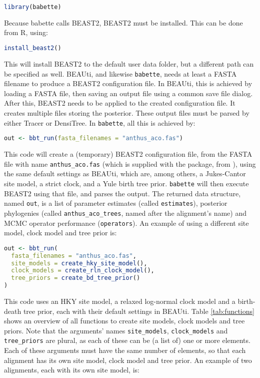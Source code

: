 \begin{lstlisting}[language=R, floatplacement=H]
library(babette)
\end{lstlisting}
Because babette calls BEAST2, BEAST2 must be installed. This can be done from R, using:

\begin{lstlisting}[language=R, floatplacement=H]
install_beast2()
\end{lstlisting}
This will install BEAST2 to the default user data folder, but a different path can be specified as well.
BEAUti, and likewise \verb;babette;, needs at least a FASTA filename
to produce a BEAST2 configuration file. 
In BEAUti, this is achieved by loading a FASTA file, 
then saving an output file using a common
save file dialog. After this, BEAST2 needs to be applied to
the created configuration file. It creates multiple files
storing the posterior. These output
files must be parsed by either Tracer or DensiTree.
In \verb;babette;, all this is achieved by:

\begin{lstlisting}[language=R, floatplacement=H]
out <- bbt_run(fasta_filenames = "anthus_aco.fas")
\end{lstlisting}
This code will create a (temporary) BEAST2 configuration file,
from the FASTA file with name \verb;anthus_aco.fas; (which
is supplied with the package, from \cite{VanEls2018}), 
using the same default settings as BEAUti, which are, 
among others, a Jukes-Cantor site model, a strict clock, and a Yule birth tree prior.
\verb;babette; will then execute BEAST2 using that file, and
parses the output. The returned data structure, named \verb;out;, 
is a list of parameter estimates (called \verb;estimates;), posterior 
phylogenies (called \verb;anthus_aco_trees;, named after
the alignment's name) and MCMC operator performance (\verb;operators;).
An example of using a different site model, clock model 
and tree prior is:

\begin{lstlisting}[language=R, floatplacement=H]
out <- bbt_run(
  fasta_filenames = "anthus_aco.fas",
  site_models = create_hky_site_model(),
  clock_models = create_rln_clock_model(),
  tree_priors = create_bd_tree_prior()
)
\end{lstlisting}
This code uses an HKY site model, a relaxed log-normal clock model and a 
birth-death tree prior, each with their default settings in BEAUti.
Table \ref{tab:functions} shows an overview of all functions to 
create site models, clock models and tree priors.
Note that the arguments' names \verb;site_models;, \verb;clock_models; 
and \verb;tree_priors; are plural, as each of these
can be (a list of) one or more elements. Each of these arguments must 
have the same number of elements, so that each alignment has its
own site model, clock model and tree prior. 
An example of two alignments, each with its own site model, is:


